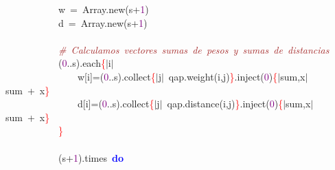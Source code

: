 \mbox{}\ \ \ \ \ \ \ \ \ \ \ \ w\ \textcolor{BrickRed}{=}\ Array\textcolor{BrickRed}{.}new\textcolor{BrickRed}{(}s\textcolor{BrickRed}{+}\textcolor{Purple}{1}\textcolor{BrickRed}{)} \\
\mbox{}\ \ \ \ \ \ \ \ \ \ \ \ d\ \textcolor{BrickRed}{=}\ Array\textcolor{BrickRed}{.}new\textcolor{BrickRed}{(}s\textcolor{BrickRed}{+}\textcolor{Purple}{1}\textcolor{BrickRed}{)} \\
\mbox{}\ \ \ \ \ \ \ \ \ \ \ \  \\
\mbox{}\ \ \ \ \ \ \ \ \ \ \ \ \textit{\textcolor{Brown}{\#\ Calculamos\ vectores\ sumas\ de\ pesos\ y\ sumas\ de\ distancias}} \\
\mbox{}\ \ \ \ \ \ \ \ \ \ \ \ \textcolor{BrickRed}{(}\textcolor{Purple}{0}\textcolor{BrickRed}{..}s\textcolor{BrickRed}{).}each\textcolor{Red}{\{}\textcolor{BrickRed}{$|$}i\textcolor{BrickRed}{$|$}\  \\
\mbox{}\ \ \ \ \ \ \ \ \ \ \ \ \ \ \ \ w\textcolor{BrickRed}{[}i\textcolor{BrickRed}{]=(}\textcolor{Purple}{0}\textcolor{BrickRed}{..}s\textcolor{BrickRed}{).}collect\textcolor{Red}{\{}\textcolor{BrickRed}{$|$}j\textcolor{BrickRed}{$|$}\ qap\textcolor{BrickRed}{.}weight\textcolor{BrickRed}{(}i\textcolor{BrickRed}{,}j\textcolor{BrickRed}{)}\textcolor{Red}{\}}\textcolor{BrickRed}{.}inject\textcolor{BrickRed}{(}\textcolor{Purple}{0}\textcolor{BrickRed}{)}\textcolor{Red}{\{}\textcolor{BrickRed}{$|$}sum\textcolor{BrickRed}{,}x\textcolor{BrickRed}{$|$}\ sum\ \textcolor{BrickRed}{+}\ x\textcolor{Red}{\}} \\
\mbox{}\ \ \ \ \ \ \ \ \ \ \ \ \ \ \ \ d\textcolor{BrickRed}{[}i\textcolor{BrickRed}{]=(}\textcolor{Purple}{0}\textcolor{BrickRed}{..}s\textcolor{BrickRed}{).}collect\textcolor{Red}{\{}\textcolor{BrickRed}{$|$}j\textcolor{BrickRed}{$|$}\ qap\textcolor{BrickRed}{.}distance\textcolor{BrickRed}{(}i\textcolor{BrickRed}{,}j\textcolor{BrickRed}{)}\textcolor{Red}{\}}\textcolor{BrickRed}{.}inject\textcolor{BrickRed}{(}\textcolor{Purple}{0}\textcolor{BrickRed}{)}\textcolor{Red}{\{}\textcolor{BrickRed}{$|$}sum\textcolor{BrickRed}{,}x\textcolor{BrickRed}{$|$}\ sum\ \textcolor{BrickRed}{+}\ x\textcolor{Red}{\}} \\
\mbox{}\ \ \ \ \ \ \ \ \ \ \ \ \textcolor{Red}{\}} \\
\mbox{}\ \ \ \ \ \ \ \ \ \ \ \  \\
\mbox{}\ \ \ \ \ \ \ \ \ \ \ \ \textcolor{BrickRed}{(}s\textcolor{BrickRed}{+}\textcolor{Purple}{1}\textcolor{BrickRed}{).}times\ \textbf{\textcolor{Blue}{do}} \\
